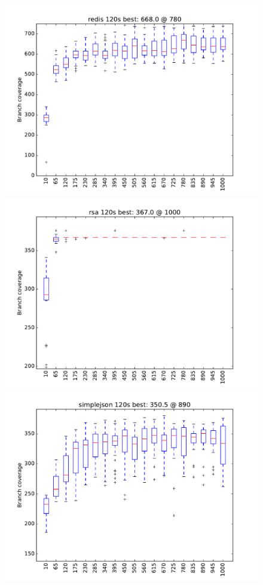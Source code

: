 \documentclass[sigplan]{acmart}
\begin{document}
\begin{figure}
\includegraphics[width=0.9\columnwidth]{graphs/redisrand120}
\includegraphics[width=0.9\columnwidth]{graphs/rsarand120}
\includegraphics[width=0.9\columnwidth]{graphs/simplejsonrand120}

\end{figure}
\end{document}
